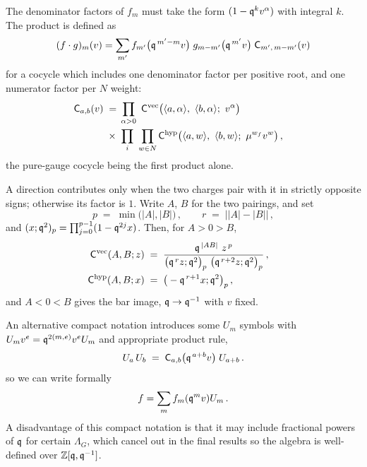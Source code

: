\documentclass[12pt]{amsart}
\begin{document}
The denominator factors of $f_m$ must take the form $(1-\mathfrak{q}^k v^\alpha)$ with integral $k$. The product is defined as 
\begin{equation}\label{eq:fgprod}
	(f \cdot g)_m(v) = \sum_{m'} f_{m'}\big(\mathfrak{q}^{\,m'-m} v\big)\;
	g_{m-m'}\big(\mathfrak{q}^{\,m'} v\big)\; \mathsf{C}_{m',\,m-m'}(v)
\end{equation}	
for a cocycle which includes one denominator factor per positive
root, and one numerator factor per $N$ weight:
\begin{align}\label{eq:ccprod}
	\cocy_{a,b}(v) \;=\;
	&\prod_{\alpha>0}\ \cocy^{\rm vec}
	  \big(\langle a,\alpha\rangle,\ \langle b,\alpha\rangle;\ v^{\alpha}\big) \cr
	\times\ &\prod_{i}\ \prod_{w\in N}
	  \cocy^{\rm hyp}\big(\langle a,w\rangle,\ \langle b,w\rangle;\ \mu^{w_f} v^{w}\big) \,,
\end{align}
the pure-gauge cocycle being the first product alone. 

A direction contributes only when the two charges pair with it in strictly
opposite signs; otherwise its factor is $1$. Write $A$, $B$ for the two pairings, and set
\begin{equation}
	p \;=\; \min\big(|A|,|B|\big) \,, \qquad r \;=\; \big||A|-|B|\big| \,,
\end{equation}
and $(x;\mathfrak{q}^{2})_p = \prod_{j=0}^{p-1}(1-\mathfrak{q}^{2j}x)$. Then, for $A>0>B$,
\begin{align}\label{eq:ccclosed}
	\cocy^{\rm vec}(A,B;z) &\;=\;
	\frac{\fq^{\,|AB|}\ z^{\,p}}
	     {\big(\fq^{\,r}z;\fq^{2}\big)_{p}\ \big(\fq^{\,r+2}z;\fq^{2}\big)_{p}}\,, \cr
	\cocy^{\rm hyp}(A,B;x) &\;=\; \big(-\fq^{\,r+1}x;\fq^{2}\big)_{p}\,,
\end{align}
and $A<0<B$ gives the bar image, $\mathfrak{q}\to\mathfrak{q}^{-1}$ with $v$ fixed.

An alternative compact notation introduces some $U_m$ symbols with $U_m v^e = \mathfrak{q}^{2 (m,e)} v^e U_m$ and appropriate product rule, 
\begin{equation}\label{eq:cocydef}
	U_a\, U_b \;=\; \mathsf{C}_{a,b}\big(\mathfrak{q}^{\,a+b}v\big)\; U_{a+b} \,.
\end{equation}
so we can write formally 
\begin{equation}
	f = \sum_m f_m(\mathfrak{q}^m v) U_m \, .
\end{equation}
A disadvantage of this compact notation is that it may include fractional powers of $\mathfrak{q}$ for certain $\Lambda_G$, which cancel out in 
the final results so the algebra is well-defined over $\mathbb{Z}[\mathfrak{q}, \mathfrak{q}^{-1}]$. 
\end{document}

